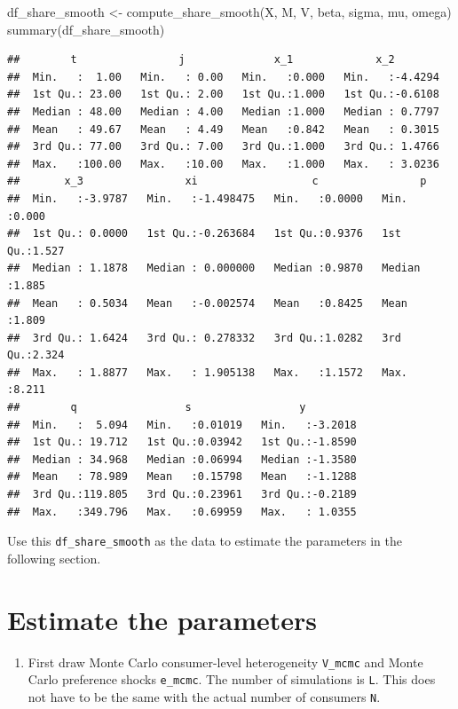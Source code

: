\documentclass[
]{book}
\newenvironment{Shaded}{\begin{snugshade}}{\end{snugshade}}
\newcommand{\FunctionTok}[1]{\textcolor[rgb]{0.00,0.00,0.00}{#1}}
\newcommand{\NormalTok}[1]{#1}
\newcommand{\OtherTok}[1]{\textcolor[rgb]{0.56,0.35,0.01}{#1}}
\providecommand{\tightlist}{%
  \setlength{\itemsep}{0pt}\setlength{\parskip}{0pt}}
\begin{document}
\begin{Shaded}
\begin{Highlighting}[]
\NormalTok{df\_share\_smooth }\OtherTok{\textless{}{-}} \FunctionTok{compute\_share\_smooth}\NormalTok{(X, M, V, beta, sigma, mu, omega)}
\FunctionTok{summary}\NormalTok{(df\_share\_smooth)}
\end{Highlighting}
\end{Shaded}

\begin{verbatim}
##        t                j              x_1             x_2         
##  Min.   :  1.00   Min.   : 0.00   Min.   :0.000   Min.   :-4.4294  
##  1st Qu.: 23.00   1st Qu.: 2.00   1st Qu.:1.000   1st Qu.:-0.6108  
##  Median : 48.00   Median : 4.00   Median :1.000   Median : 0.7797  
##  Mean   : 49.67   Mean   : 4.49   Mean   :0.842   Mean   : 0.3015  
##  3rd Qu.: 77.00   3rd Qu.: 7.00   3rd Qu.:1.000   3rd Qu.: 1.4766  
##  Max.   :100.00   Max.   :10.00   Max.   :1.000   Max.   : 3.0236  
##       x_3                xi                  c                p        
##  Min.   :-3.9787   Min.   :-1.498475   Min.   :0.0000   Min.   :0.000  
##  1st Qu.: 0.0000   1st Qu.:-0.263684   1st Qu.:0.9376   1st Qu.:1.527  
##  Median : 1.1878   Median : 0.000000   Median :0.9870   Median :1.885  
##  Mean   : 0.5034   Mean   :-0.002574   Mean   :0.8425   Mean   :1.809  
##  3rd Qu.: 1.6424   3rd Qu.: 0.278332   3rd Qu.:1.0282   3rd Qu.:2.324  
##  Max.   : 1.8877   Max.   : 1.905138   Max.   :1.1572   Max.   :8.211  
##        q                 s                 y          
##  Min.   :  5.094   Min.   :0.01019   Min.   :-3.2018  
##  1st Qu.: 19.712   1st Qu.:0.03942   1st Qu.:-1.8590  
##  Median : 34.968   Median :0.06994   Median :-1.3580  
##  Mean   : 78.989   Mean   :0.15798   Mean   :-1.1288  
##  3rd Qu.:119.805   3rd Qu.:0.23961   3rd Qu.:-0.2189  
##  Max.   :349.796   Max.   :0.69959   Max.   : 1.0355
\end{verbatim}

Use this \texttt{df\_share\_smooth} as the data to estimate the parameters in the following section.

\hypertarget{estimate-the-parameters-2}{%
\section{Estimate the parameters}\label{estimate-the-parameters-2}}

\begin{enumerate}
\def\labelenumi{\arabic{enumi}.}
\tightlist
\item
  First draw Monte Carlo consumer-level heterogeneity \texttt{V\_mcmc} and Monte Carlo preference shocks \texttt{e\_mcmc}. The number of simulations is \texttt{L}. This does not have to be the same with the actual number of consumers \texttt{N}.
\end{enumerate}
\end{document}
